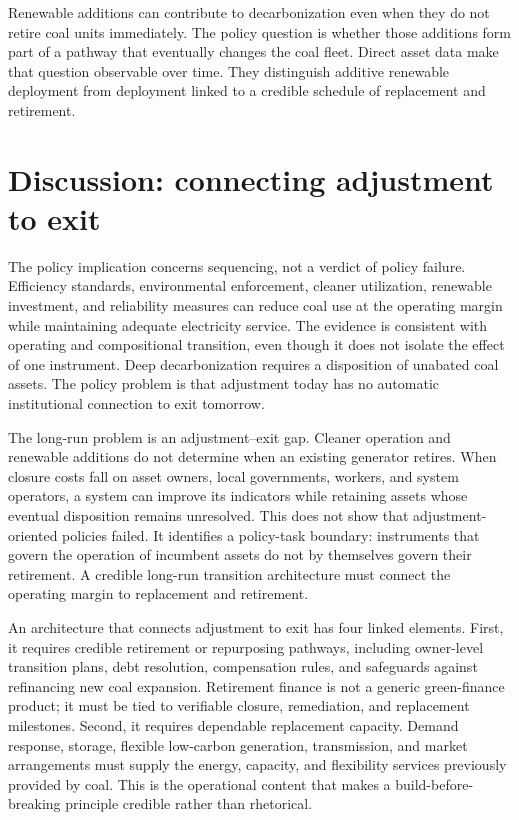 \documentclass[11pt]{article}
\begin{document}
Renewable additions can contribute to decarbonization even when they do not retire coal units immediately. The policy question is whether those additions form part of a pathway that eventually changes the coal fleet. Direct asset data make that question observable over time. They distinguish additive renewable deployment from deployment linked to a credible schedule of replacement and retirement.

\section{Discussion: connecting adjustment to exit}

The policy implication concerns sequencing, not a verdict of policy failure. Efficiency standards, environmental enforcement, cleaner utilization, renewable investment, and reliability measures can reduce coal use at the operating margin while maintaining adequate electricity service. The evidence is consistent with operating and compositional transition, even though it does not isolate the effect of one instrument. Deep decarbonization requires a disposition of unabated coal assets. The policy problem is that adjustment today has no automatic institutional connection to exit tomorrow.

The long-run problem is an adjustment--exit gap. Cleaner operation and renewable additions do not determine when an existing generator retires. When closure costs fall on asset owners, local governments, workers, and system operators, a system can improve its indicators while retaining assets whose eventual disposition remains unresolved. This does not show that adjustment-oriented policies failed. It identifies a policy-task boundary: instruments that govern the operation of incumbent assets do not by themselves govern their retirement. A credible long-run transition architecture must connect the operating margin to replacement and retirement.

An architecture that connects adjustment to exit has four linked elements. First, it requires credible retirement or repurposing pathways, including owner-level transition plans, debt resolution, compensation rules, and safeguards against refinancing new coal expansion. Retirement finance is not a generic green-finance product; it must be tied to verifiable closure, remediation, and replacement milestones. Second, it requires dependable replacement capacity. Demand response, storage, flexible low-carbon generation, transmission, and market arrangements must supply the energy, capacity, and flexibility services previously provided by coal. This is the operational content that makes a build-before-breaking principle credible rather than rhetorical.
\end{document}
